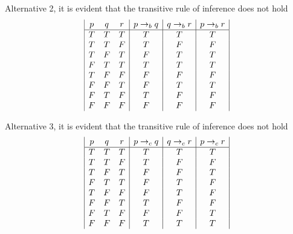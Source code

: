 \documentclass[12pt, a4paper]{article}
\begin{document}
\begin{enumerate}[Q\arabic*.]
  Alternative 2, it is evident that the transitive rule of inference does not hold
  \begin{displaymath}
    \begin{array}{|c c c|c|c|c|}
      p & q & r & p \rightarrow_b q & q \rightarrow_b r & p \rightarrow_b r\\ %
      \hline %
      T & T & T & T & T & T\\
      T & T & F & T & F & F\\
      T & F & T & F & T & T\\
      F & T & T & T & T & T\\
      T & F & F & F & F & F\\
      F & F & T & F & T & T\\
      F & T & F & T & F & F\\
      F & F & F & F & F & F\\
    \end{array}
  \end{displaymath}

  Alternative 3, it is evident that the transitive rule of inference does not hold
  \begin{displaymath}
    \begin{array}{|c c c|c|c|c|}
      p & q & r & p \rightarrow_c q & q \rightarrow_c r & p \rightarrow_c r\\ %
      \hline %
      T & T & T & T & T & T\\
      T & T & F & T & F & F\\
      T & F & T & F & F & T\\
      F & T & T & F & T & F\\
      T & F & F & F & T & F\\
      F & F & T & T & F & F\\
      F & T & F & F & F & T\\
      F & F & F & T & T & T\\
    \end{array}
  \end{displaymath}


\end{enumerate}
\end{document}
